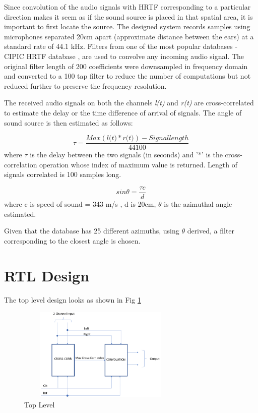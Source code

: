 \documentclass[conference]{IEEEtran}
\begin{document}
Since convolution of the audio signals with HRTF corresponding to a particular direction makes it seem as if the sound source is placed in that spatial area, it is important to first locate the source. The designed system records samples using microphones separated 20cm apart (approximate distance between the ears) at a standard rate of 44.1 kHz. Filters from one of the most popular databases - CIPIC HRTF database \cite{cipic}, are used to convolve any incoming audio signal. The original filter length of 200 coefficients were downsampled in frequency domain and converted to a 100 tap filter to reduce the number of computations but not reduced further to preserve the frequency resolution.

The received audio signals on both the channels \textit{l(t)} and \textit{r(t)} are cross-correlated to estimate the delay or the time difference of arrival of signals. The angle of sound source is then estimated as follows: 

\begin{equation}
\tau = \frac{Max(\textit{l(t)} * \textit{r(t)}) - Signal length}{44100} 
\label{tdelay}
\end{equation}
where $\tau$ is the delay between the two signals (in seconds) and '*' is the cross-correlation operation whose index of maximum value is returned. Length of signals correlated is 100 samples long. 

\begin{equation}
sin\theta = \frac{\tau c}{d}
\label{angle}
\end{equation}
where c is speed of sound = 343 m/s , d is 20cm, $\theta$ is the azimuthal angle estimated.

Given that the database has 25 different azimuths, using $\theta$ derived, a filter corresponding to the closest angle is chosen.         

\section{RTL Design}
The top level design looks as shown in Fig \ref{fig:top_level}

\begin{figure}
    \centering
    \includegraphics[width = 8cm, height = 4.5cm]{overall_design.png}
    \caption{Top Level}
    \label{fig:top_level}
\end{figure}
\end{document}

